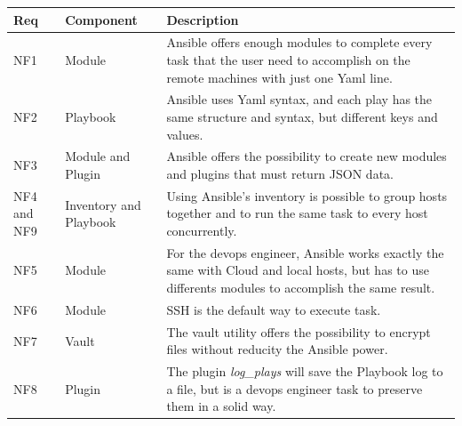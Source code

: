 \documentclass[conference]{IEEEtran}
\begin{document}
\begin{table}[htbp]
\begin{center}
\begin{tabular}{|p{0.6cm}|p{1.4cm}|p{5cm}|}
\hline
\textbf{Req} &\textbf{Component}&  \textbf{Description} \\
\hline
\hline
NF1 & Module & Ansible offers enough modules to complete every task that the user need to accomplish on the remote machines with just one Yaml line.\\
\hline
NF2 & Playbook & Ansible uses Yaml syntax, and each play has the same structure and syntax, but different keys and values.\\
\hline
NF3 & Module and Plugin & Ansible offers the possibility to create new modules and plugins that must return JSON data.\\
\hline
NF4 and NF9 & Inventory and Playbook & Using Ansible's inventory is possible to group hosts together and to run the same task to every host concurrently.\\
\hline 
NF5 & Module & For the devops engineer, Ansible works exactly the same with Cloud and local hosts, but has to use differents modules to accomplish the same result.\\
\hline
NF6 & Module & SSH is the default way to execute task.\\
\hline
NF7 & Vault & The vault utility offers the possibility to encrypt files without reducity the Ansible power.\\
\hline
NF8 & Plugin & The plugin \textit{log\_plays} will save the Playbook log to a file, but is a devops engineer task to preserve them in a solid way.\\
\hline
\end{tabular}
\label{tab3}
\end{center}
\end{table} 
\end{document}
